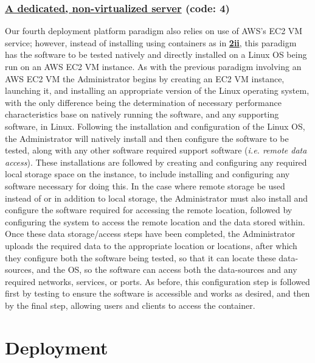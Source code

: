 \subsubsection{\underline{A dedicated, non-virtualized server} (code: \textbf{4})}
 Our fourth deployment platform paradigm also relies on use of AWS's EC2 VM service; however, instead of installing using containers as in \textbf{\underline{2ii}}, this paradigm has the software to be tested natively and directly installed on a Linux OS being run on an AWS EC2 VM instance.  As with the previous paradigm involving an AWS EC2 VM the Administrator begins by creating an EC2 VM instance, launching it, and installing an appropriate version of the Linux operating system, with the only difference being the determination of necessary performance characteristics base on natively running the software, and any supporting software, in Linux.  Following the installation and configuration of the Linux OS, the Administrator will natively install and then configure the software to be tested, along with any other software required support software (\emph{i.e. remote data access}).  These installations are followed by creating and configuring any required local storage space on the instance, to include installing and configuring any software necessary for doing this.  In the case where remote storage be used instead of or in addition to local storage, the Administrator must also install and configure the software required for accessing the remote location, followed by configuring the system to access the remote location and the data stored within.  Once these data storage/access steps have been completed, the Administrator uploads the required data to the appropriate location or locations, after which they configure both the software being tested, so that it can locate these data-sources, and the OS, so the software can access both the data-sources and any required networks, services, or ports.  As before, this configuration step is followed first by testing to ensure the software is accessible and works as desired, and then by the final step, allowing users and clients to access the container.






\section{Deployment}

